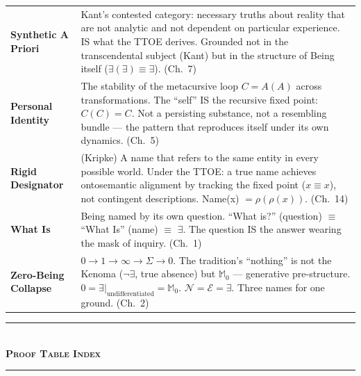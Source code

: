 \documentclass[10pt, openany, oneside]{book}
\renewcommand{\normalsize}{\fontsize{10}{13}\selectfont}
\begin{document}
{\begin{tabular}{@{} l @{\hspace{0.6em}} p{} @{}}
\textbf{Synthetic A Priori} & Kant's contested category: necessary truths about reality that are not analytic and not dependent on particular experience. IS what the TTOE derives. Grounded not in the transcendental subject (Kant) but in the structure of Being itself ($\exists(\exists) \equiv \exists$). (Ch.\ 7) \\[0.3em]
\textbf{Personal Identity} & The stability of the metacursive loop $C = A(A)$ across transformations. The ``self'' IS the recursive fixed point: $C(C) = C$. Not a persisting substance, not a resembling bundle --- the pattern that reproduces itself under its own dynamics. (Ch.\ 5) \\[0.3em]
\textbf{Rigid Designator} & (Kripke) A name that refers to the same entity in every possible world. Under the TTOE: a true name achieves ontosemantic alignment by tracking the fixed point ($x \equiv x$), not contingent descriptions. Name(x) $= \rho(\rho(x))$. (Ch.\ 14) \\[0.3em]
\textbf{What Is} & Being named by its own question. ``What is?'' (question) $\equiv$ ``What Is'' (name) $\equiv$ $\exists$. The question IS the answer wearing the mask of inquiry. (Ch.\ 1) \\[0.3em]
\textbf{Zero-Being Collapse} & $0 \to 1 \to \infty \to \Sigma \to 0$. The tradition's ``nothing'' is not the Kenoma ($\neg\exists$, true absence) but $\mathbb{M}_0$ --- generative pre-structure. $0 = \exists|_{\text{undifferentiated}} = \mathbb{M}_0$. $\mathcal{N} = \mathcal{E} = \exists$. Three names for one ground. (Ch.\ 2) \\[0.3em]
\end{tabular}
}

\vspace{1.5em}


\begin{center}
    \rule{0.3\textwidth}{0.4pt}\\[0.5em]
    {\normalsize\bfseries\scshape Proof Table Index}\\[0.3em]
    \rule{0.3\textwidth}{0.4pt}
\end{center}

\vspace{1em}
\end{document}
